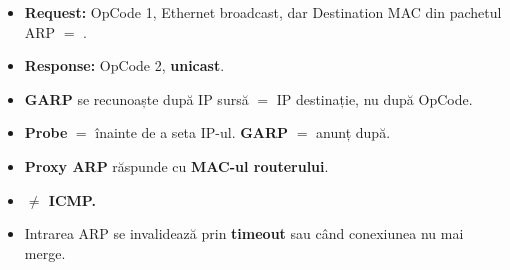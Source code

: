 \documentclass[11pt,a4paper]{article}
\begin{document}
\begin{capcana}
\begin{itemize}
  \item \textbf{Request:} OpCode 1, Ethernet broadcast, dar Destination MAC din pachetul ARP $=$ .
  \item \textbf{Response:} OpCode 2, \textbf{unicast}.
  \item \textbf{GARP} se recunoaște după IP sursă $=$ IP destinație, nu după OpCode.
  \item \textbf{Probe} $=$ înainte de a seta IP-ul. \textbf{GARP} $=$ anunț după.
  \item \textbf{Proxy ARP} răspunde cu \textbf{MAC-ul routerului}.
  \item \textbf{ $\neq$ ICMP.}
  \item Intrarea ARP se invalidează prin \textbf{timeout} sau când conexiunea nu mai merge.
\end{itemize}
\end{capcana}
\end{document}
